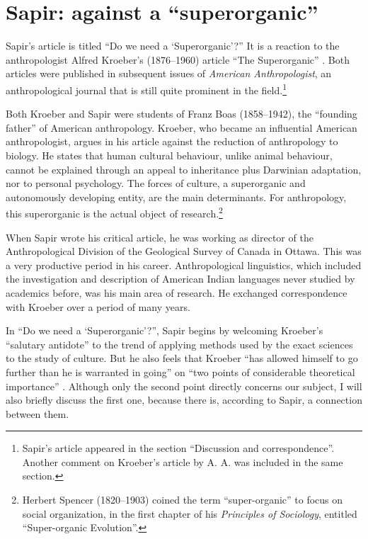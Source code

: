 \documentclass[output=paper]{langscibook}
\begin{document}
\section{Sapir: against a ``superorganic''}
\label{sec:elffers:superorganic}

Sapir's \citeyear{Sapir1917} article is titled ``Do we need a `Superorganic'?'' It is a reaction to the anthropologist Alfred Kroeber's (1876--1960) article ``The Superorganic'' \citep{Kroeber1917}. Both articles were published in subsequent issues of \emph{American Anthropologist}, an anthropological journal that is still quite prominent in the field.\footnote{Sapir's article appeared in the section ``Discussion and correspondence''. Another comment on Kroeber's article by A. A. \citet{Goldenweiser1917} was included in the same section.}

Both Kroeber and Sapir were students of Franz Boas (1858--1942), the ``founding father'' of American anthropology. Kroeber, who became an influential American anthropologist, argues in his \citeyear{Kroeber1917} article against the reduction of anthropology to biology. He states that human cultural behaviour, unlike animal behaviour, cannot be explained through an appeal to inheritance plus Darwinian adaptation, nor to personal psychology. The forces of culture, a superorganic and autonomously developing entity, are the main determinants. For anthropology, this superorganic is the actual object of research.\footnote{Herbert Spencer (1820--1903) coined the term ``super-organic'' to focus on social organization, in the first chapter of his \citeyear{Spencer1898} \emph{Principles of Sociology}, entitled ``Super-organic Evolution''.}

When Sapir wrote his critical article, he was working as director of the Anthropological Division of the Geological Survey of Canada in Ottawa. This was a very productive period in his career. Anthropological linguistics, which included the investigation and description of American Indian languages never studied by academics before, was his main area of research. He exchanged correspondence with Kroeber over a period of many years.

In ``Do we need a `Superorganic'?'', Sapir begins by welcoming Kroeber's ``salutary antidote'' to the trend of applying methods used by the exact sciences to the study of culture. But he also feels that Kroeber ``has allowed himself to go further than he is warranted in going'' on ``two points of considerable theoretical importance'' \citep[441]{Sapir1917}. Although only the second point directly concerns our subject, I will also briefly discuss the first one, because there is, according to Sapir, a connection between them.
\end{document}
